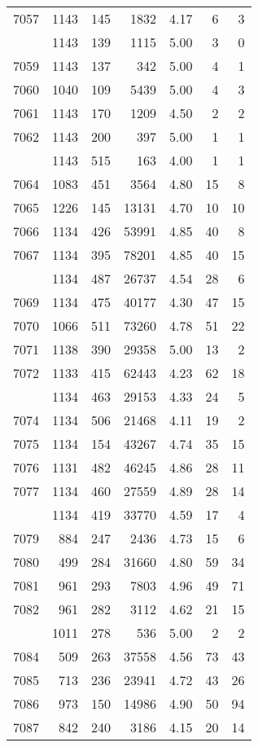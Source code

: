 \documentclass[
]{article}
\begin{document}
\begin{table}
\begin{tabular}[t]{lrrrrrr}
7057 & 1143 & 145 & 1832 & 4.17 & 6 & 3\\
\addlinespace
7058 & 1143 & 139 & 1115 & 5.00 & 3 & 0\\
7059 & 1143 & 137 & 342 & 5.00 & 4 & 1\\
7060 & 1040 & 109 & 5439 & 5.00 & 4 & 3\\
7061 & 1143 & 170 & 1209 & 4.50 & 2 & 2\\
7062 & 1143 & 200 & 397 & 5.00 & 1 & 1\\
\addlinespace
7063 & 1143 & 515 & 163 & 4.00 & 1 & 1\\
7064 & 1083 & 451 & 3564 & 4.80 & 15 & 8\\
7065 & 1226 & 145 & 13131 & 4.70 & 10 & 10\\
7066 & 1134 & 426 & 53991 & 4.85 & 40 & 8\\
7067 & 1134 & 395 & 78201 & 4.85 & 40 & 15\\
\addlinespace
7068 & 1134 & 487 & 26737 & 4.54 & 28 & 6\\
7069 & 1134 & 475 & 40177 & 4.30 & 47 & 15\\
7070 & 1066 & 511 & 73260 & 4.78 & 51 & 22\\
7071 & 1138 & 390 & 29358 & 5.00 & 13 & 2\\
7072 & 1133 & 415 & 62443 & 4.23 & 62 & 18\\
\addlinespace
7073 & 1134 & 463 & 29153 & 4.33 & 24 & 5\\
7074 & 1134 & 506 & 21468 & 4.11 & 19 & 2\\
7075 & 1134 & 154 & 43267 & 4.74 & 35 & 15\\
7076 & 1131 & 482 & 46245 & 4.86 & 28 & 11\\
7077 & 1134 & 460 & 27559 & 4.89 & 28 & 14\\
\addlinespace
7078 & 1134 & 419 & 33770 & 4.59 & 17 & 4\\
7079 & 884 & 247 & 2436 & 4.73 & 15 & 6\\
7080 & 499 & 284 & 31660 & 4.80 & 59 & 34\\
7081 & 961 & 293 & 7803 & 4.96 & 49 & 71\\
7082 & 961 & 282 & 3112 & 4.62 & 21 & 15\\
\addlinespace
7083 & 1011 & 278 & 536 & 5.00 & 2 & 2\\
7084 & 509 & 263 & 37558 & 4.56 & 73 & 43\\
7085 & 713 & 236 & 23941 & 4.72 & 43 & 26\\
7086 & 973 & 150 & 14986 & 4.90 & 50 & 94\\
7087 & 842 & 240 & 3186 & 4.15 & 20 & 14\\

\end{tabular}
\end{table}
\end{document}
